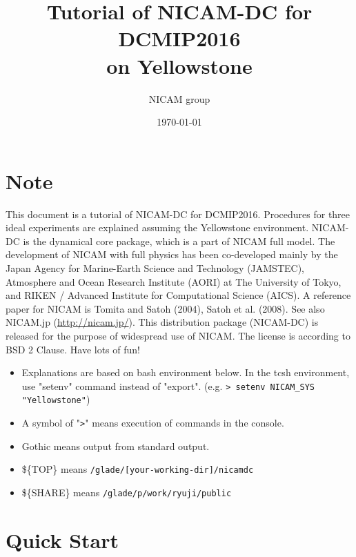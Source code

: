 \documentclass[a4paper]{article}
\title{{\Huge Tutorial of NICAM-DC for DCMIP2016\\
              on Yellowstone \\
        \vspace{1cm}{\Large Version 2.0} }}
\author{\Large NICAM group}
\date{\today}
\begin{document}
\maketitle

\vspace{5cm}

\section*{Note}
 This document is a tutorial of NICAM-DC for DCMIP2016. Procedures for three
 ideal experiments are explained assuming the Yellowstone environment.
 NICAM-DC is the dynamical core package, which is a part of NICAM full model.
 The development of NICAM with full physics has been co-developed mainly by
 the Japan Agency for Marine-Earth Science and Technology (JAMSTEC), Atmosphere
 and Ocean Research Institute (AORI) at The University of Tokyo, and RIKEN / Advanced
 Institute for Computational Science (AICS). A reference paper for NICAM is
 Tomita and Satoh (2004), Satoh et al. (2008). See also NICAM.jp (\url{http://nicam.jp/}). 
 This distribution package (NICAM-DC) is released for the purpose of widespread
 use of NICAM. The license is according to BSD 2 Clause. Have lots of fun!

 \hrulefill
 \begin{itemize}
   \item Explanations are based on bash environment below.
         In the tcsh environment, use "setenv" command instead of "export".
         (e.g. \verb|> setenv NICAM_SYS "Yellowstone"|)
   \item A symbol of "\verb|>|" means execution of commands in the console.
   \item Gothic means output from standard output.
   \item \$\{TOP\}   means \verb|/glade/[your-working-dir]/nicamdc|
   \item \$\{SHARE\} means \verb|/glade/p/work/ryuji/public|
 \end{itemize}



\clearpage

\tableofcontents

\clearpage


\section{Quick Start}
\end{document}
